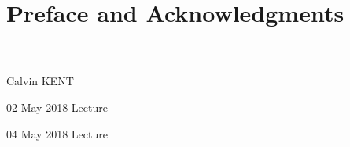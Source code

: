 \documentclass[11pt]{book} %
\begin{document}
	\renewcommand*{\Term}{Term 201x} %
	\renewcommand*{\CourseCode}{MATH 000} %
	\renewcommand*{\CourseName}{Course Name} %
	\renewcommand*{\ProfName}{ProfFName ProfLName} %
	\renewcommand*{\LDate}{00 MONTH 201x} %
	\renewcommand*{\COlink}{http://www.student.math.uwaterloo.ca/~c2kent/} %
	\classtitle
	\pagestyle{plain}
	\section*{Preface and Acknowledgments}
	\CKpreface\\~\\
	\rrule
	\hfill Calvin KENT
	\clearpage
	\pagestyle{Lecture}
	\fancyhfoffset[E,O]{0pt} %
	\begin{comment}
	\end{comment}
\begin{lec}{02 May 2018}
	Lecture
\end{lec}
\begin{lec}{04 May 2018}
	Lecture
\end{lec}
\end{document}
